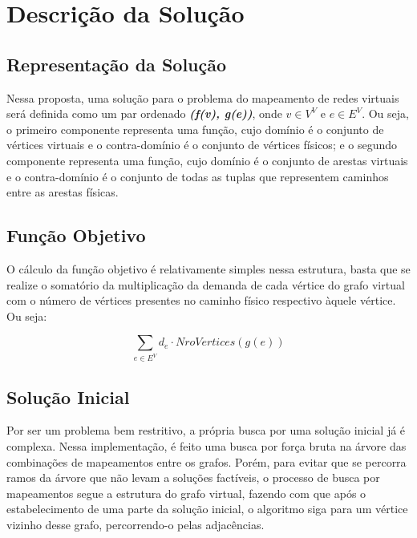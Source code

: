 \documentclass{article}
\begin{document}
\section{Descrição da Solução}
\subsection{Representação da Solução}
Nessa proposta, uma solução para o problema do mapeamento de redes virtuais será definida como um par ordenado \textbf{\emph{(f(v), g(e))}}, onde \textbf{\emph{\(v \in V^{V}\)}} e \textbf{\emph{\(e \in E^{V}\)}}. Ou seja, o primeiro componente representa uma função, cujo domínio é o conjunto de vértices virtuais e o contra-domínio é o conjunto de vértices físicos; e o segundo componente representa uma função, cujo domínio é o conjunto de arestas virtuais e o contra-domínio é o conjunto de todas as tuplas que representem caminhos entre as arestas físicas.

\subsection{Função Objetivo}
O cálculo da função objetivo é relativamente simples nessa estrutura, basta que se realize o somatório da multiplicação da demanda de cada vértice do grafo virtual com o número de vértices presentes no caminho físico respectivo àquele vértice. Ou seja:

\begin{displaymath}
\sum_{e \in E^{V}} d_{e} \cdot NroVertices(g(e))
\end{displaymath}

\subsection{Solução Inicial}
Por ser um problema bem restritivo, a própria busca por uma solução inicial já é complexa. Nessa implementação, é feito uma busca por força bruta na árvore das combinações de mapeamentos entre os grafos. Porém, para evitar que se percorra ramos da árvore que não levam a soluções factíveis, o processo de busca por mapeamentos segue a estrutura do grafo virtual, fazendo com que após o estabelecimento de uma parte da solução inicial, o algoritmo siga para um vértice vizinho desse grafo, percorrendo-o pelas adjacências.
\end{document}
